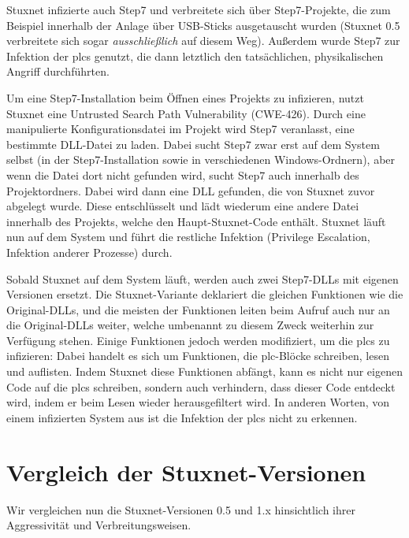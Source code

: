 \documentclass[a4paper]{article}
\begin{document}
Stuxnet infizierte auch Step7 und verbreitete sich über Step7-Projekte,
die zum Beispiel innerhalb der Anlage über USB-Sticks ausgetauscht wurden
(Stuxnet 0.5 verbreitete sich sogar \emph{ausschließlich} auf diesem Weg).
Außerdem wurde Step7 zur Infektion der \glspl{plc} genutzt, die dann letztlich den tatsächlichen, physikalischen Angriff durchführten.

Um eine Step7-Installation beim Öffnen eines Projekts zu infizieren, nutzt Stuxnet eine Untrusted Search Path Vulnerability (CWE-426\cite{cwe_searchpath}).
Durch eine manipulierte Konfigurationsdatei im Projekt wird Step7 veranlasst, eine bestimmte DLL-Datei zu laden.
Dabei sucht Step7 zwar erst auf dem System selbst (in der Step7-Installation sowie in verschiedenen Windows-Ordnern), %
aber wenn die Datei dort nicht gefunden wird, sucht Step7 auch innerhalb des Pro\-jekt\-ord\-ners.
Dabei wird dann eine DLL gefunden, die von Stuxnet zuvor abgelegt wurde.
Diese entschlüsselt und lädt wiederum eine andere Datei innerhalb des Projekts, welche den Haupt-Stuxnet-Code enthält.
Stuxnet läuft nun auf dem System und führt die restliche Infektion (Privilege Escalation, Infektion anderer Prozesse) durch.

Sobald Stuxnet auf dem System läuft, werden auch zwei Step7-DLLs mit eigenen Versionen ersetzt.
Die Stuxnet-Variante deklariert die gleichen Funktionen wie die Original-DLLs,
und die meisten der Funktionen leiten beim Aufruf auch nur an die Original-DLLs weiter,
welche umbenannt zu diesem Zweck weiterhin zur Verfügung stehen.
Einige Funktionen jedoch werden modifiziert, um die \glspl{plc} zu infizieren:
Dabei handelt es sich um Funktionen, die \gls{plc}-Blöcke schreiben, lesen und auflisten.
Indem Stuxnet diese Funktionen abfängt, kann es nicht nur eigenen Code auf die \glspl{plc} schreiben,
sondern auch verhindern, dass dieser Code entdeckt wird, indem er beim Lesen wieder herausgefiltert wird.
In anderen Worten, von einem infizierten System aus ist die Infektion der \glspl{plc} nicht zu erkennen.


\section{Vergleich der Stuxnet-Versionen}

Wir vergleichen nun die Stuxnet-Versionen 0.5 und 1.x hinsichtlich ihrer Aggressivität und Verbreitungsweisen.
\end{document}
